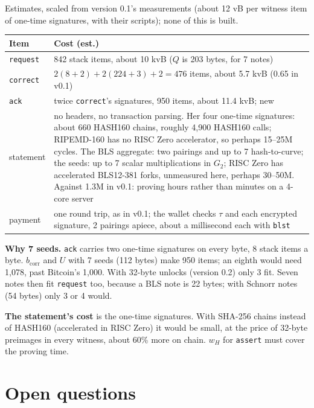 \documentclass[11pt]{article}
\theoremstyle{plain}
\theoremstyle{definition}
\newcommand{\bcorr}{b_{\mathrm{corr}}}
\newcommand{\tx}[1]{\texttt{#1}}
\begin{document}
Estimates, scaled from version 0.1's measurements (about 12 vB per
witness item of one-time signatures, with their scripts); none of this
is built.

\begin{center}
\begin{tabularx}{\linewidth}{lL}
\toprule
Item & Cost (est.) \\
\midrule
\tx{request} & 842 stack items, about 10 kvB ($Q$ is 203 bytes, for 7 notes) \\
\tx{correct} & $2(8 + 2) + 2(224 + 3) + 2 = 476$ items, about 5.7 kvB (0.65 in v0.1) \\
\tx{ack} & twice \tx{correct}'s signatures, 950 items, about 11.4 kvB; new \\
statement & no headers, no transaction parsing. Her four one-time signatures: about 660 HASH160 chains, roughly 4,900 HASH160 calls; RIPEMD-160 has no RISC Zero accelerator, so perhaps 15--25M cycles. The BLS aggregate: two pairings and up to 7 hash-to-curve; the seeds: up to 7 scalar multiplications in $G_2$; RISC Zero has accelerated BLS12-381 forks, unmeasured here, perhaps 30--50M. Against 1.3M in v0.1: proving hours rather than minutes on a 4-core server \\
payment & one round trip, as in v0.1; the wallet checks $\tau$ and each encrypted signature, 2 pairings apiece, about a millisecond each with \tx{blst} \\
\bottomrule
\end{tabularx}
\end{center}

\textbf{Why 7 seeds.} \tx{ack} carries two one-time signatures on
every byte, 8 stack items a byte. $\bcorr$ and $U$ with 7 seeds (112
bytes) make 950 items; an eighth would need 1,078, past Bitcoin's
1,000. With 32-byte unlocks (version 0.2) only 3 fit. Seven notes then
fit \tx{request} too, because a BLS note is 22 bytes; with Schnorr
notes (54 bytes) only 3 or 4 would.

\textbf{The statement's cost} is the one-time signatures. With SHA-256
chains instead of HASH160 (accelerated in RISC Zero) it would be small,
at the price of 32-byte preimages in every witness, about 60\% more
on chain. $w_H$ for \tx{assert} must cover the proving time.

\section{Open questions}\label{sec:open}
\end{document}
